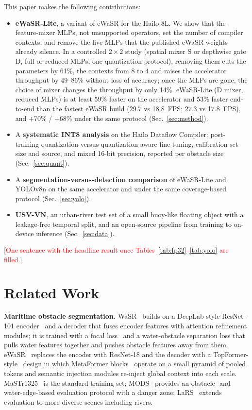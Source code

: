 \documentclass[conference]{IEEEtran}
\newcommand{\tbd}[1]{\textcolor{red}{[#1]}}
\begin{document}
This paper makes the following contributions:
\begin{itemize}
\item \textbf{eWaSR-Lite}, a variant of eWaSR for the Hailo-8L. We show that the feature-mixer MLPs, not unsupported operators, set the number of compiler contexts, and remove the five MLPs that the published eWaSR weights already silence. In a controlled $2\times2$ study (spatial mixer S or depthwise gate D, full or reduced MLPs, one quantization protocol), removing them cuts the parameters by 61\%, the contexts from 8 to 4 and raises the accelerator throughput by 49--86\% without loss of accuracy; once the MLPs are gone, the choice of mixer changes the throughput by only 14\%. eWaSR-Lite (D mixer, reduced MLPs) is at least 59\% faster on the accelerator and 53\% faster end-to-end than the fastest eWaSR build (29.7 vs 18.8~FPS; 27.3 vs 17.8~FPS), and +70\% / +68\% under the same protocol (Sec.~\ref{sec:method}).
\item A \textbf{systematic INT8 analysis} on the Hailo Dataflow Compiler: post-training quantization versus quantization-aware fine-tuning, calibration-set size and source, and mixed 16-bit precision, reported per obstacle size (Sec.~\ref{sec:quant}).
\item A \textbf{segmentation-versus-detection comparison} of eWaSR-Lite and YOLOv8n on the same accelerator and under the same coverage-based protocol (Sec.~\ref{sec:yolo}).
\item \textbf{USV-VN}, an urban-river test set of a small buoy-like floating object with a leakage-free temporal split, and an open-source pipeline from training to on-device inference (Sec.~\ref{sec:data}).
\end{itemize}
\tbd{One sentence with the headline result once Tables~\ref{tab:fp32}--\ref{tab:yolo} are filled.}

\section{Related Work}
\textbf{Maritime obstacle segmentation.} WaSR~\cite{bovcon2022wasr} builds on a DeepLab-style ResNet-101 encoder~\cite{chen2018deeplab,he2016resnet} and a decoder that fuses encoder features with attention refinement modules; it is trained with a focal loss~\cite{lin2017focal} and a water-obstacle separation loss that pulls water features together and pushes obstacle features away from them. eWaSR~\cite{tersek2023ewasr} replaces the encoder with ResNet-18 and the decoder with a TopFormer-style~\cite{zhang2022topformer} design in which MetaFormer blocks~\cite{yu2022metaformer} operate on a small pyramid of pooled tokens and semantic injection modules re-inject global context into each scale. MaSTr1325~\cite{bovcon2019mastr} is the standard training set; MODS~\cite{bovcon2022mods} provides an obstacle- and water-edge-based evaluation protocol with a danger zone; LaRS~\cite{zust2023lars} extends evaluation to more diverse scenes including rivers.
\end{document}
